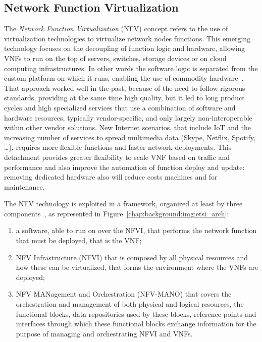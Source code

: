 \subsection{Network Function Virtualization}
The \emph{Network Function Virtualization} (NFV) concept refers to the use of
virtualization technologies to virtualize network nodes functions. This emerging
technology focuses on the decoupling of function logic and hardware, allowing
VNFs to run on the top of servers, switches, storage devices or on cloud
computing infrastructures. In other words the software logic is separated from
the custom platform on which it runs, enabling the use of commodity
hardware~\cite{gray2016network}. That approach worked well in the past, because
of the need to follow rigorous standards, providing at the same time high
quality, but it led to long product cycles and high specialized services that
use a combination of software and hardware resources, typically vendor-specific,
and only largely non-interoperable within other vendor solutions. New Internet
scenarios, that include IoT and the increasing number of services to spread
multimedia data (Skype, Netflix, Spotify, \dots), requires more flexible
functions and faster network deployments. This detachment provides greater
flexibility to scale VNF based on traffic and performance and also improve the
automation of function deploy and update: removing dedicated hardware also will
reduce costs machines and for maintenance.

The NFV technology is exploited in a framework, organized
at least by three components~\cite{etsi2013gs}, as represented in
Figure~\ref{chap:background:img:etsi_arch}:
\begin{enumerate}
  \item a software, able to run on over the NFVI, that performs the network
  function that must be deployed, that is the VNF;
  \item NFV Infrastructure (NFVI) that is composed by all physical resources
  and how these can be virtualized, that forms the environment where the VNFs
  are deployed;
  \item NFV MANagement and Orchestration (NFV-MANO) that covers the
  orchestration and management of both physical and logical resources, the
  functional blocks, data repositories used by these blocks, reference points
  and interfaces through which these functional blocks exchange
  information for the purpose of managing and orchestrating NFVI and VNFs.
\end{enumerate}

